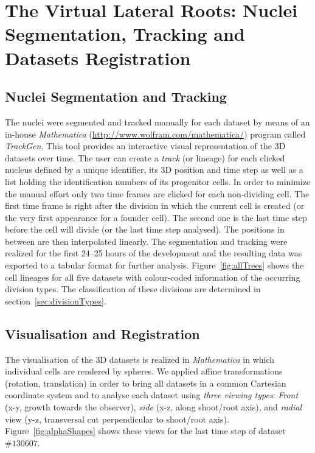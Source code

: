 \documentclass[11pt,a4paper, final]{article}
\begin{document}
\clearpage
\section{The Virtual Lateral Roots: Nuclei Segmentation, Tracking and Datasets Registration}

\subsection{Nuclei Segmentation and Tracking}
\label{sec:segmentation}
\noindent
The nuclei were segmented and tracked manually for each dataset by means of an in-house \textit{Mathematica} (\href{http://www.wolfram.com/mathematica/}{http://www.wolfram.com/mathematica/}) program called \textit{TrackGen}. This tool provides an interactive visual representation of the 3D datasets over time. The user can create a \textit{track} (or lineage) for each clicked nucleus defined by a unique identifier, its 3D position and time step as well as a list holding the identification numbers of its progenitor cells. In order to minimize the manual effort only two time frames are clicked for each non-dividing cell. The first time frame is right after the division in which the current cell is created (or the very first appearance for a founder cell). The second one is the last time step before the cell will divide (or the last time step analysed). The positions in between are then interpolated linearly. The segmentation and tracking were realized for the first 24--25 hours of the development and the resulting data was exported to a tabular format for further analysis. Figure~\ref{fig:allTrees} shows the cell lineages for all five datasets with colour-coded information of the occurring division types. The classification of these divisions are determined in section~\ref{sec:divisionTypes}.

\subsection{Visualisation and Registration}
\noindent
The visualisation of the 3D datasets is realized in \textit{Mathematica} in which individual cells are rendered by spheres. We applied affine transformations (rotation, translation) in order to bring all datasets in a common Cartesian coordinate system and to analyse each dataset using \textit{three viewing types}: \textit{Front} (x-y, growth towards the observer), \textit{side} (x-z, along shoot/root axis),  and \textit{radial} view (y-z, transversal cut perpendicular to shoot/root axis). Figure~\ref{fig:alphaShapes} shows these views for the last time step of dataset $\# 130607$.
\end{document}
